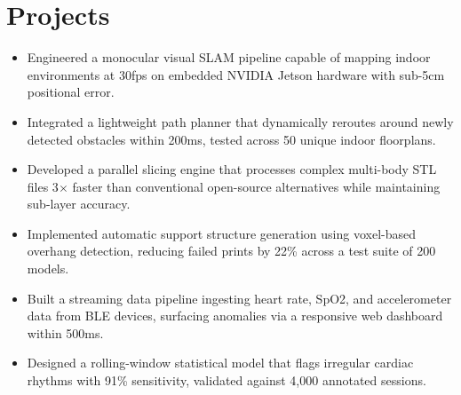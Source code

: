 \documentclass{slate-resume}
\begin{document}
\section{Projects}
\begin{entryblock}
\begin{itemize}
  \item Engineered a monocular visual SLAM pipeline capable of mapping indoor environments at 30fps on embedded NVIDIA Jetson hardware with sub-5cm positional error.
  \item Integrated a lightweight path planner that dynamically reroutes around newly detected obstacles within 200ms, tested across 50 unique indoor floorplans.
\end{itemize}
\end{entryblock}
\entrygap
\begin{entryblock}
\begin{itemize}
  \item Developed a parallel slicing engine that processes complex multi-body STL files 3$\times$ faster than conventional open-source alternatives while maintaining sub-layer accuracy.
  \item Implemented automatic support structure generation using voxel-based overhang detection, reducing failed prints by 22\% across a test suite of 200 models.
\end{itemize}
\end{entryblock}
\entrygap
\begin{entryblock}
\begin{itemize}
  \item Built a streaming data pipeline ingesting heart rate, SpO2, and accelerometer data from BLE devices, surfacing anomalies via a responsive web dashboard within 500ms.
  \item Designed a rolling-window statistical model that flags irregular cardiac rhythms with 91\% sensitivity, validated against 4,000 annotated sessions.
\end{itemize}
\end{entryblock}
\end{document}
